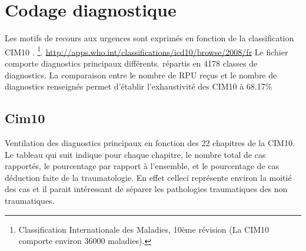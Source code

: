\documentclass[12pt,english,french,twoside]{report}\usepackage[]{graphicx}\usepackage[]{color}
\begin{document}
\chapter{Codage diagnostique}

%




Les motifs de recours aux urgences sont exprimés en fonction de la classification CIM10 \cite{10}.
\footnote{Classification Internationale des Maladies, 10ème révision (La CIM10 comporte environ 36000 maladies).}.
\url{http://apps.who.int/classifications/icd10/browse/2008/fr}
Le fichier comporte  diagnostics principaux différents.
répartis en 4178 classes de diagnostics.
La comparaison entre le nombre de RPU reçus et le nombre de diagnostics renseignés permet d'établir l'exhaustivité des CIM10 à 68.17\% 


\section{Cim10}

Ventilation des diagnostics principaux en fonction des 22 chapitres de la CIM10. Le tableau qui suit indique pour chaque chapitre, le nombre total de cas rapportés, le pourcentage par rapport à l'ensemble, et le pourcentage de cas déduction faite de la traumatologie. En effet celleci représente environ la moitié des cas et il parait intéressant de séparer les pathologies traumatiques des non traumatiques.





\end{document}
